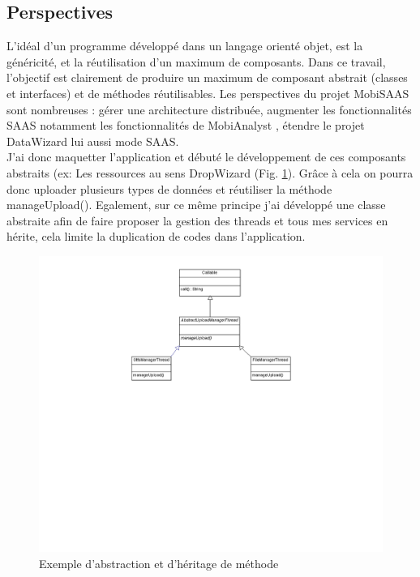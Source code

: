 \begin{itemize}
\subsection{Perspectives}

L'idéal d'un programme développé dans un langage orienté objet, est la généricité, et la réutilisation d'un maximum de composants. Dans ce travail, l'objectif est clairement de produire un maximum de composant abstrait (classes et interfaces) et de méthodes réutilisables. Les perspectives du projet \og MobiSAAS \fg sont nombreuses : gérer une architecture distribuée, augmenter les fonctionnalités SAAS notamment les fonctionnalités de \og MobiAnalyst \fg, étendre le projet \og DataWizard \fg lui aussi mode SAAS.\\

J'ai donc \og maquetter l'application \fg et débuté le développement de ces composants abstraits (ex: Les ressources au sens DropWizard (Fig. \ref{UML1}). Grâce à cela on pourra donc \og uploader \fg plusieurs types de données et réutiliser la méthode manageUpload(). Egalement, sur ce même principe j'ai développé une classe abstraite afin de faire proposer la gestion des threads et tous mes services en hérite, cela limite la duplication de codes dans l'application.\\
\begin{figure}[!h]
\centering
\includegraphics[width=14cm]{images/DiagrammeThread.png}
\caption{\label{UML1}Exemple d'abstraction et d'héritage de méthode}
\end{figure} 


\end{itemize}

